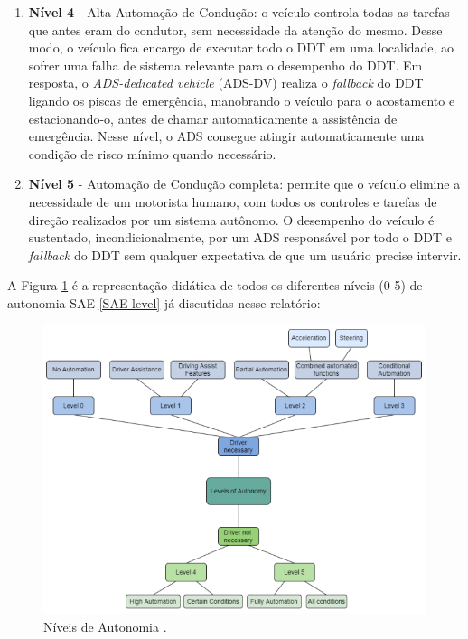 \begin{enumerate}
\item \textbf{Nível 4} - Alta Automação de Condução: o veículo controla todas as tarefas 
que antes eram do condutor, sem necessidade da atenção do mesmo. Desse modo, o veículo fica encargo de executar todo o DDT em uma localidade, ao sofrer uma falha de sistema relevante para o desempenho do DDT. Em resposta, o \textit{ADS-dedicated vehicle} (ADS-DV) realiza o \textit{fallback} do DDT ligando os piscas de emergência, manobrando o veículo para o acostamento e estacionando-o, antes de chamar automaticamente a assistência de emergência. Nesse  nível, o ADS consegue atingir automaticamente uma condição de risco mínimo quando necessário.

\item \textbf{Nível 5} - Automação de Condução completa: permite que o veículo elimine a necessidade de um motorista humano, com todos os controles e tarefas de direção realizados por um sistema autônomo. O desempenho do veículo é sustentado, incondicionalmente, por um ADS responsável por todo o DDT e \textit{fallback} do DDT sem qualquer expectativa de que um usuário precise intervir.

\end{enumerate}

A Figura \ref{niveis-auto} é a representação didática de todos os diferentes níveis (0-5) de autonomia SAE \ref{SAE-level} já discutidas nesse relatório:

\begin{figure}[H]
\centering
\includegraphics[width=\textwidth]{Figures/level-auto.png}
\caption{Níveis de Autonomia \cite{review-auto}.}
\label{niveis-auto}
\end{figure}


